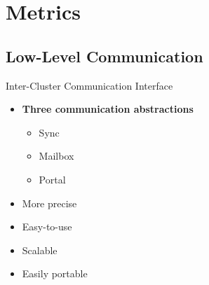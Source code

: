 \section{Metrics}

	\subsection{Low-Level Communication}

		\begin{frame}[fragile]{Inter-Cluster Communication Interface}

			\begin{itemize}
				\item \textbf{Three communication abstractions}
				\begin{itemize}
					\item Sync
					\item Mailbox
					\item Portal
				\end{itemize}
				\item More precise
				\item Easy-to-use
				\item Scalable
				\item Easily portable
			\end{itemize}


		\end{frame}

